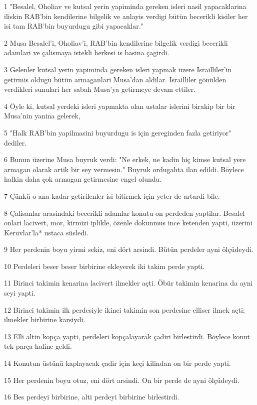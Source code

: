 \par 1 "Besalel, Oholiav ve kutsal yerin yapiminda gereken isleri nasil yapacaklarina iliskin RAB'bin kendilerine bilgelik ve anlayis verdigi bütün becerikli kisiler her isi tam RAB'bin buyurdugu gibi yapacaklar."
\par 2 Musa Besalel'i, Oholiav'i, RAB'bin kendilerine bilgelik verdigi becerikli adamlari ve çalismaya istekli herkesi is basina çagirdi.
\par 3 Gelenler kutsal yerin yapiminda gereken isleri yapmak üzere Israilliler'in getirmis oldugu bütün armaganlari Musa'dan aldilar. Israilliler gönülden verdikleri sunulari her sabah Musa'ya getirmeye devam ettiler.
\par 4 Öyle ki, kutsal yerdeki isleri yapmakta olan ustalar islerini birakip bir bir Musa'nin yanina gelerek,
\par 5 "Halk RAB'bin yapilmasini buyurdugu is için gereginden fazla getiriyor" dediler.
\par 6 Bunun üzerine Musa buyruk verdi: "Ne erkek, ne kadin hiç kimse kutsal yere armagan olarak artik bir sey vermesin." Buyruk ordugahta ilan edildi. Böylece halkin daha çok armagan getirmesine engel olundu.
\par 7 Çünkü o ana kadar getirilenler isi bitirmek için yeter de artardi bile.
\par 8 Çalisanlar arasindaki becerikli adamlar konutu on perdeden yaptilar. Besalel onlari lacivert, mor, kirmizi iplikle, özenle dokunmus ince ketenden yapti, üzerini Keruvlar'la* ustaca süsledi.
\par 9 Her perdenin boyu yirmi sekiz, eni dört arsindi. Bütün perdeler ayni ölçüdeydi.
\par 10 Perdeleri beser beser birbirine ekleyerek iki takim perde yapti.
\par 11 Birinci takimin kenarina lacivert ilmekler açti. Öbür takimin kenarina da ayni seyi yapti.
\par 12 Birinci takimin ilk perdesiyle ikinci takimin son perdesine elliser ilmek açti; ilmekler birbirine karsiydi.
\par 13 Elli altin kopça yapti, perdeleri kopçalayarak çadiri birlestirdi. Böylece konut tek parça haline geldi.
\par 14 Konutun üstünü kaplayacak çadir için keçi kilindan on bir perde yapti.
\par 15 Her perdenin boyu otuz, eni dört arsindi. On bir perde de ayni ölçüdeydi.
\par 16 Bes perdeyi birbirine, alti perdeyi birbirine birlestirdi.
